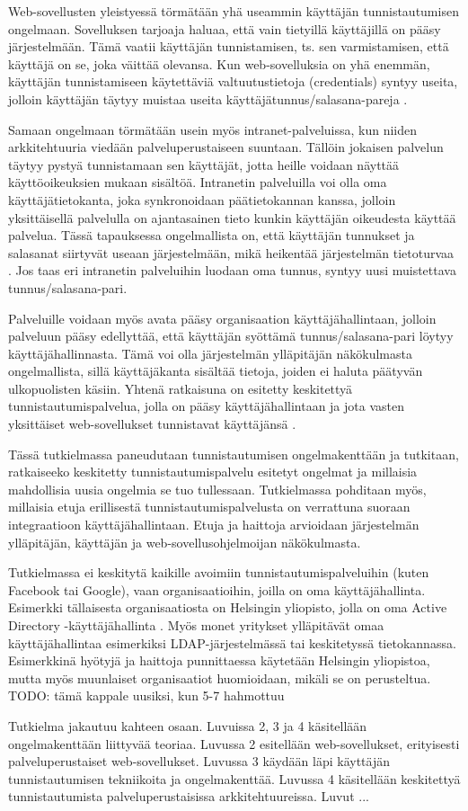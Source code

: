 Web-sovellusten yleistyessä törmätään yhä useammin käyttäjän tunnistautumisen ongelmaan. Sovelluksen tarjoaja haluaa, että vain tietyillä käyttäjillä on pääsy järjestelmään. Tämä vaatii käyttäjän tunnistamisen, ts. sen varmistamisen, että käyttäjä on se, joka väittää olevansa. Kun web-sovelluksia on yhä enemmän, käyttäjän tunnistamiseen käytettäviä valtuutustietoja (credentials) syntyy useita, jolloin käyttäjän täytyy muistaa useita käyttäjätunnus/salasana-pareja \cite{billion_keys}.

Samaan ongelmaan törmätään usein myös intranet-palveluissa, kun niiden arkkitehtuuria viedään palveluperustaiseen suuntaan. Tällöin jokaisen palvelun täytyy pystyä tunnistamaan sen käyttäjät, jotta heille voidaan näyttää käyttöoikeuksien mukaan sisältöä. Intranetin palveluilla voi olla oma käyttäjätietokanta, joka synkronoidaan päätietokannan kanssa, jolloin yksittäisellä palvelulla on ajantasainen tieto kunkin käyttäjän oikeudesta käyttää palvelua. Tässä tapauksessa ongelmallista on, että käyttäjän tunnukset ja salasanat siirtyvät useaan järjestelmään, mikä heikentää järjestelmän tietoturvaa \cite{nisti}. Jos taas eri intranetin palveluihin luodaan oma tunnus, syntyy uusi muistettava tunnus/salasana-pari.

Palveluille voidaan myös avata pääsy organisaation käyttäjähallintaan, jolloin palveluun pääsy edellyttää, että käyttäjän syöttämä tunnus/salasana-pari löytyy käyttäjähallinnasta. Tämä voi olla järjestelmän ylläpitäjän näkökulmasta ongelmallista, sillä käyttäjäkanta sisältää tietoja, joiden ei haluta päätyvän ulkopuolisten käsiin. Yhtenä ratkaisuna on esitetty keskitettyä tunnistautumispalvelua, jolla on pääsy käyttäjähallintaan ja jota vasten yksittäiset web-sovellukset tunnistavat käyttäjänsä \cite{nisti}.

Tässä tutkielmassa paneudutaan tunnistautumisen ongelmakenttään ja tutkitaan, ratkaiseeko keskitetty tunnistautumispalvelu esitetyt ongelmat ja millaisia mahdollisia uusia ongelmia se tuo tullessaan. Tutkielmassa pohditaan myös, millaisia etuja erillisestä tunnistautumispalvelusta on verrattuna suoraan integraatioon käyttäjähallintaan. Etuja ja haittoja arvioidaan järjestelmän ylläpitäjän, käyttäjän ja web-sovellusohjelmoijan näkökulmasta.

Tutkielmassa ei keskitytä kaikille avoimiin tunnistautumispalveluihin (kuten Facebook tai Google), vaan organisaatioihin, joilla on oma käyttäjähallinta. Esimerkki tällaisesta organisaatiosta on Helsingin yliopisto, jolla on oma Active Directory -käyttäjähallinta \cite{tietotekniikkaa}. Myös monet yritykset ylläpitävät omaa käyttäjähallintaa esimerkiksi LDAP-järjestelmässä tai keskitetyssä tietokannassa. Esimerkkinä hyötyjä ja haittoja punnittaessa käytetään Helsingin yliopistoa, mutta myös muunlaiset organisaatiot huomioidaan, mikäli se on perusteltua. TODO: tämä kappale uusiksi, kun 5-7 hahmottuu

Tutkielma jakautuu kahteen osaan. Luvuissa 2, 3 ja 4 käsitellään ongelmakenttään liittyvää teoriaa. Luvussa 2 esitellään web-sovellukset, erityisesti palveluperustaiset web-sovellukset. Luvussa 3 käydään läpi käyttäjän tunnistautumisen tekniikoita ja ongelmakenttää. Luvussa 4 käsitellään keskitettyä tunnistautumista palveluperustaisissa arkkitehtuureissa. Luvut ...
